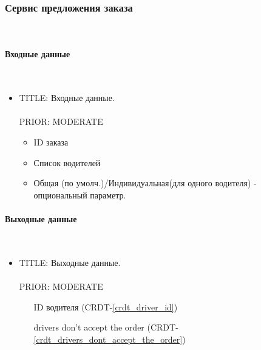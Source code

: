 \subsubsection{Сервис предложения заказа} \mbox{} \\ \label{order_offering_service}

    \paragraph{Входные данные} \mbox{} \\ \label{}

      \begin{itemize}

        \item{

          TITLE: Входные данные.\\
          \\
          PRIOR: MODERATE\\

        }

        \begin{itemize}
          \item ID заказа
          \item Список водителей
          \item Общая (по умолч.)/Индивидуальная(для одного водителя) - опциональный параметр.
        \end{itemize}

      \end{itemize}

    \paragraph{Выходные данные} \mbox{} \\

      \begin{itemize}

        \item{

          TITLE: Выходные данные.\\
          \\
          PRIOR: MODERATE\\

        }

        \begin{itemize}
          \item [ID водителя] (CRDT-\ref{crdt_driver_id})
          \item [drivers don't accept the order] (CRDT-\ref{crdt_drivers_dont_accept_the_order})
        \end{itemize}

      \end{itemize}

